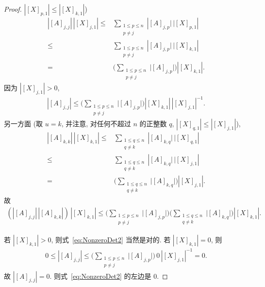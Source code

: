 \documentclass[../libro.tex]{subfiles}
\begin{document}
\begin{proof}
    \(|[X]_{p,1}| \leq |[X]_{k,1}|\)) %
    \begin{align*}
        |[A]_{j,j}|\, |[X]_{j,1}|
        \leq {} &
        \sum_{\substack{1 \leq p \leq n \\ p \neq j}}
        {|{[A]_{j,p}|\, |[X]_{p,1}}|}
        \\
        \leq {} &
        \sum_{\substack{1 \leq p \leq n \\ p \neq j}}
        {|{[A]_{j,p}|\, |[X]_{k,1}}|}
        \\
        = {} &
        \Bigg(
            \sum_{\substack{1 \leq p \leq n \\ p \neq j}}
            {|{[A]_{j,p}|}}
        \Bigg)
        |[X]_{k,1}|.
    \end{align*}
    因为 \(|[X]_{j,1}| > 0\),
    \begin{align*}
        |[A]_{j,j}|
        \leq
        \Bigg(
            \sum_{\substack{1 \leq p \leq n \\ p \neq j}}
            {|{[A]_{j,p}|}}
        \Bigg)
        |[X]_{k,1}|\, |[X]_{j,1}|^{-1}.
    \end{align*}
    另一方面
    (取 \(u = k\), %
    并注意, 对任何不超过 \(n\) 的正整数 \(q\),
    \(|[X]_{q,1}| \leq |[X]_{j,1}|\)), %
    \begin{align*}
        |[A]_{k,k}|\, |[X]_{k,1}|
        \leq {} &
        \sum_{\substack{1 \leq q \leq n \\ q \neq k}}
        {|{[A]_{k,q}|\, |[X]_{q,1}}|}
        \\
        \leq {} &
        \sum_{\substack{1 \leq q \leq n \\ q \neq k}}
        {|{[A]_{k,q}|\, |[X]_{j,1}}|}
        \\
        = {} &
        \Bigg(
            \sum_{\substack{1 \leq q \leq n \\ q \neq k}}
            {|{[A]_{k,q}|}}
        \Bigg)
        |[X]_{j,1}|.
    \end{align*}
    故
    \begin{align*}
        (|[A]_{j,j}|\, |[A]_{k,k}|)\,
        |[X]_{k,1}|
        \leq
        \Bigg(
            \sum_{\substack{1 \leq p \leq n \\ p \neq j}}
            {|{[A]_{j,p}|}}
        \Bigg)
        \Bigg(
            \sum_{\substack{1 \leq q \leq n \\ q \neq k}}
            {|{[A]_{k,q}|}}
        \Bigg)
        |[X]_{k,1}|.
    \end{align*}

    若 \(|[X]_{k,1}| > 0\),
    则式~\eqref{eq:NonzeroDet2} 当然是对的.
    若 \(|[X]_{k,1}| = 0\),
    则
    \begin{align*}
        0 \leq
        |[A]_{j,j}| \leq
        \Bigg(
            \sum_{\substack{1 \leq p \leq n \\ p \neq j}}
            {|{[A]_{j,p}|}}
        \Bigg)\,
        0\, |[X]_{j,1}|^{-1} = 0.
    \end{align*}
    故 \(|[A]_{j,j}| = 0\).
    则式~\eqref{eq:NonzeroDet2} 的左边是 \(0\).
\end{proof}
\end{document}
